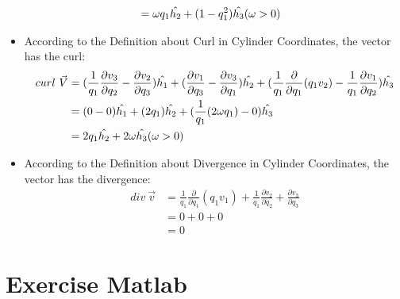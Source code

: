 \documentclass[12pt,a4paper]{article}
\begin{document}
\begin{itemize}
\begin{equation}
\begin{aligned}
    &= \omega q_1\hat{h_2} + (1-q_1^2)\hat{h_3}(\omega > 0)\notag
    \end{aligned}
    \end{equation}
    \item According to the Definition about Curl in Cylinder Coordinates, the vector has the curl:
    \begin{equation}
    \begin{aligned}
    curl\ \vec{V} &= (\frac{1}{q_1}\frac{\partial v_3}{\partial q_2} - \frac{\partial v_2}{\partial q_3})\hat{h_1} +(\frac{\partial v_1}{\partial q_3} - \frac{\partial v_3}{\partial q_1})\hat{h_2}+(\frac{1}{q_1}\frac{\partial}{\partial q_1}(q_1v_2) - \frac{1}{q_1}\frac{\partial v_1}{\partial q_2})\hat{h_3}\\
    &= (0 - 0)\hat{h_1} + (2q_1)\hat{h_2}+(\frac{1}{q_1}(2\omega q_1) - 0)\hat{h_3}\\
    &= 2q_1\hat{h_2}+2\omega\hat{h_3}(\omega > 0)\notag
    \end{aligned}
    \end{equation}
    \item According to the Definition about Divergence in Cylinder Coordinates, the vector has the divergence:
    \begin{equation}
    \begin{aligned}
    div\ \vec{v} &= \frac{1}{q_1}\frac{\partial}{\partial q_1}(q_1v_1) + \frac{1}{q_1}\frac{\partial v_2}{\partial q_2}+ \frac{\partial v_3}{\partial q_3}\\
    &= 0 + 0 + 0\\
    &= 0
    \end{aligned}
    \end{equation}
    
\end{itemize}

\section{Exercise Matlab}\label{intro}
\end{document}
